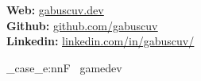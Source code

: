 \documentclass[9pt]{developercv} %
\begin{document}
\begin{minipage}[t]{0.30\textwidth} %
	\vspace{-\baselineskip} %
	
	\textbf{Web: }{\href{https://gabuscuv.dev}{\color{blue}\underline{gabuscuv.dev}}}\\
	\textbf{Github: }{\href{https://github.com/gabuscuv}{\color{blue}\underline{github.com/gabuscuv}}}\\
	\textbf{Linkedin: }{\href{https://www.linkedin.com/in/gabuscuv/}{\color{blue}\underline{linkedin.com/in/gabuscuv/}}}\\
\end{minipage}


\vspace{0.5cm}





\MainTechnologies{\langsa}{\jobtype}
\hfill
\ContributonsAndForks{\langsa}{\jobtype}
\hfill
\AdditionalInformation{\langsa}{\jobtype}

\ExplSyntaxOn

\str_case_e:nnF~{\jobtype}
{
	{gamedev}{
		\Projects{\langsa}{\jobtype}
		\JobExperience{\langsa}{\jobtype}
		}
}{
\JobExperience{\langsa}{\jobtype}	
\Projects{\langsa}{\jobtype}
}%

\ExplSyntaxOff


\Education{\langsa}{\jobtype}

\Courses{\langsa}{\jobtype}

\end{document}
